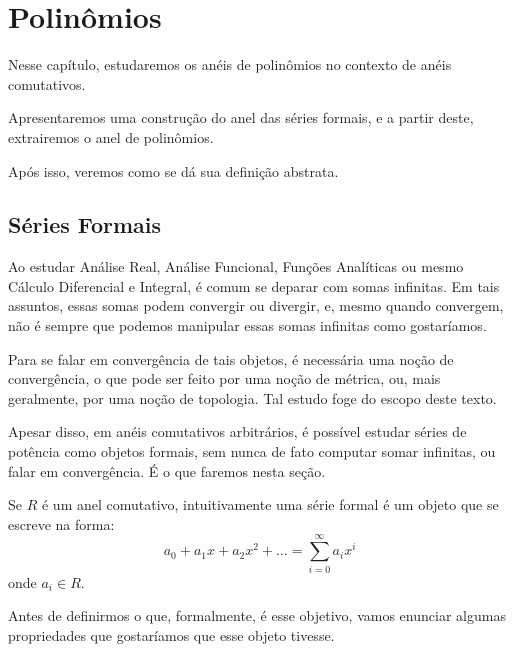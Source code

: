 \chapter{Polinômios}
Nesse capítulo, estudaremos os anéis de polinômios no contexto de anéis comutativos.

Apresentaremos uma construção do anel das séries formais, e a partir deste, extrairemos o anel de polinômios.

Após isso, veremos como se dá sua definição abstrata.
\section{Séries Formais}
Ao estudar Análise Real, Análise Funcional, Funções Analíticas ou mesmo Cálculo Diferencial e Integral, é comum se deparar com somas infinitas. Em tais assuntos, essas somas podem convergir ou divergir, e, mesmo quando convergem, não é sempre que podemos manipular essas somas infinitas como gostaríamos.

Para se falar em convergência de tais objetos, é necessária uma noção de convergência, o que pode ser feito por uma noção de métrica, ou, mais geralmente, por uma noção de topologia.
Tal estudo foge do escopo deste texto.

Apesar disso, em anéis comutativos arbitrários, é possível estudar séries de potência como objetos formais, sem nunca de fato computar somar infinitas, ou falar em convergência. É o que faremos nesta seção.


Se $R$ é um anel comutativo, intuitivamente uma série formal é um objeto que se escreve na forma:
$$a_0+a_1x+a_2x^2+\dots=\sum_{i=0}^\infty a_ix^i$$
onde $a_i\in R$.

Antes de definirmos o que, formalmente, é esse objetivo, vamos enunciar algumas propriedades que gostaríamos que esse objeto tivesse.

